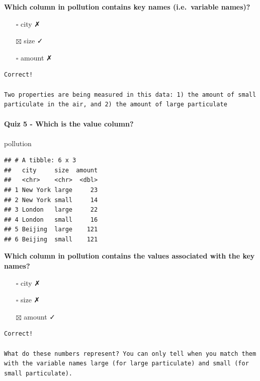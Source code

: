 \documentclass[
]{article}
\newenvironment{Shaded}{\begin{snugshade}}{\end{snugshade}}
\newcommand{\NormalTok}[1]{#1}
\providecommand{\tightlist}{%
  \setlength{\itemsep}{0pt}\setlength{\parskip}{0pt}}
\begin{document}
\textbf{Which column in pollution contains key names (i.e.~variable
names)?}

\begin{itemize}
\tightlist
\item[$\square$]
  city ✗
\item[$\boxtimes$]
  size ✓
\item[$\square$]
  amount ✗
\end{itemize}

\begin{verbatim}
Correct!

Two properties are being measured in this data: 1) the amount of small particulate in the air, and 2) the amount of large particulate
\end{verbatim}

\hypertarget{quiz-5---which-is-the-value-column}{%
\paragraph{Quiz 5 - Which is the value
column?}\label{quiz-5---which-is-the-value-column}}

\begin{Shaded}
\begin{Highlighting}[]
\NormalTok{pollution}
\end{Highlighting}
\end{Shaded}

\begin{verbatim}
## # A tibble: 6 x 3
##   city     size  amount
##   <chr>    <chr>  <dbl>
## 1 New York large     23
## 2 New York small     14
## 3 London   large     22
## 4 London   small     16
## 5 Beijing  large    121
## 6 Beijing  small    121
\end{verbatim}

\textbf{Which column in pollution contains the values associated with
the key names?}

\begin{itemize}
\tightlist
\item[$\square$]
  city ✗
\item[$\square$]
  size ✗
\item[$\boxtimes$]
  amount ✓
\end{itemize}

\begin{verbatim}
Correct!

What do these numbers represent? You can only tell when you match them with the variable names large (for large particulate) and small (for small particulate).
\end{verbatim}
\end{document}
